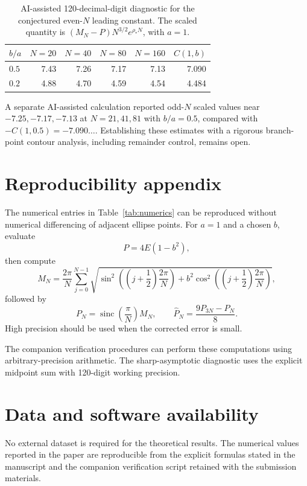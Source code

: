 \documentclass[11pt]{article}
\theoremstyle{definition}
\newcommand{\sinc}{\operatorname{sinc}}
\numberwithin{equation}{section}
\begin{document}
\begin{table}[ht]\centering\small
\caption{AI-assisted 120-decimal-digit diagnostic for the conjectured
even-$N$ leading constant. The scaled quantity is
$(M_N-P)N^{3/2}e^{\rho_*N}$, with $a=1$.}
\label{tab:sharp-evidence}
\begin{tabular}{@{}lrrrrr@{}}\toprule
$b/a$ & $N=20$ & $N=40$ & $N=80$ & $N=160$ & $C(1,b)$\\\midrule
$0.5$ & 7.43 & 7.26 & 7.17 & 7.13 & 7.090\\
$0.2$ & 4.88 & 4.70 & 4.59 & 4.54 & 4.484\\\bottomrule
\end{tabular}
\end{table}
A separate AI-assisted calculation reported odd-$N$ scaled values near
$-7.25,-7.17,-7.13$ at $N=21,41,81$ with $b/a=0.5$, compared with
$-C(1,0.5)=-7.090\ldots$.  Establishing these estimates with a
rigorous branch-point contour analysis, including remainder control,
remains open.

\section{Reproducibility appendix}

The numerical entries in Table~\ref{tab:numerics} can be reproduced
without numerical differencing of adjacent ellipse points.  For
\(a=1\) and a chosen \(b\), evaluate
\[
P=4E(1-b^2),
\]
then compute
\[
M_N
=
\frac{2\pi}{N}
\sum_{j=0}^{N-1}
\sqrt{
\sin^2\!\left(\left(j+\frac12\right)\frac{2\pi}{N}\right)
+
b^2
\cos^2\!\left(\left(j+\frac12\right)\frac{2\pi}{N}\right)
},
\]
followed by
\[
P_N=\sinc\!\left(\frac{\pi}{N}\right)M_N,
\qquad
\widehat P_N=\frac{9P_{3N}-P_N}{8}.
\]
High precision should be used when the corrected error is small.

The companion verification procedures can perform these computations
using arbitrary-precision arithmetic. The sharp-asymptotic diagnostic
uses the explicit midpoint sum with 120-digit working precision.


\section*{Data and software availability}

No external dataset is required for the theoretical results.  The
numerical values reported in the paper are reproducible from the
explicit formulas stated in the manuscript and the companion
verification script retained with the submission materials.
\end{document}
